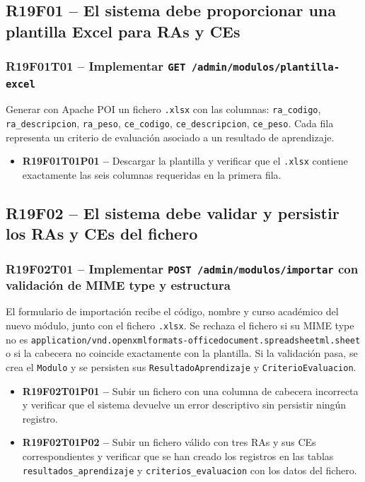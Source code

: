 \documentclass[12pt, a4paper]{report}
\begin{document}
\subsection{R19F01 -- El sistema debe proporcionar una plantilla Excel para RAs y CEs}

\subsubsection{R19F01T01 -- Implementar \texttt{GET /admin/modulos/plantilla-excel}}
Generar con Apache POI un fichero \texttt{.xlsx} con las columnas: \texttt{ra\_codigo}, \texttt{ra\_descripcion}, \texttt{ra\_peso}, \texttt{ce\_codigo}, \texttt{ce\_descripcion}, \texttt{ce\_peso}. Cada fila representa un criterio de evaluación asociado a un resultado de aprendizaje.
\begin{itemize}
  \item \textbf{R19F01T01P01 --} Descargar la plantilla y verificar que el \texttt{.xlsx} contiene exactamente las seis columnas requeridas en la primera fila.
\end{itemize}

\subsection{R19F02 -- El sistema debe validar y persistir los RAs y CEs del fichero}

\subsubsection{R19F02T01 -- Implementar \texttt{POST /admin/modulos/importar} con validación de MIME type y estructura}
El formulario de importación recibe el código, nombre y curso académico del nuevo módulo, junto con el fichero \texttt{.xlsx}. Se rechaza el fichero si su MIME type no es \texttt{application/vnd.openxmlformats-officedocument.spreadsheetml.sheet} o si la cabecera no coincide exactamente con la plantilla. Si la validación pasa, se crea el \texttt{Modulo} y se persisten sus \texttt{ResultadoAprendizaje} y \texttt{CriterioEvaluacion}.
\begin{itemize}
  \item \textbf{R19F02T01P01 --} Subir un fichero con una columna de cabecera incorrecta y verificar que el sistema devuelve un error descriptivo sin persistir ningún registro.
  \item \textbf{R19F02T01P02 --} Subir un fichero válido con tres RAs y sus CEs correspondientes y verificar que se han creado los registros en las tablas \texttt{resultados\_aprendizaje} y \texttt{criterios\_evaluacion} con los datos del fichero.
\end{itemize}
\end{document}
